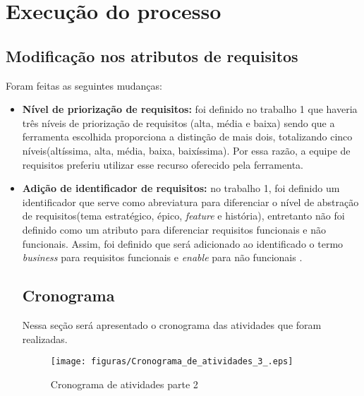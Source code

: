 \chapter[Execução do processo]{Execução do processo}

\section{Modificação nos atributos de requisitos}
Foram feitas as seguintes mudanças:
\begin{itemize}
\item \textbf{Nível de priorização de requisitos:}
foi definido no trabalho 1 que haveria três níveis de priorização de requisitos (alta, média e baixa) sendo que a ferramenta escolhida proporciona a distinção de mais dois, totalizando cinco níveis(altíssima, alta, média, baixa, baixíssima). Por essa razão, a equipe de requisitos preferiu utilizar esse recurso oferecido pela ferramenta.
\item \textbf{Adição de identificador de requisitos:}
no trabalho 1, foi definido um identificador que serve como abreviatura para diferenciar o nível de abstração de requisitos(tema estratégico, épico, \textit{feature} e história), entretanto não foi definido como um atributo para diferenciar requisitos funcionais e não funcionais. Assim, foi definido que será adicionado ao identificado o termo \textit{business} para requisitos funcionais e \textit{enable} para não funcionais \cite{safe}.
\section{Cronograma}
Nessa seção será apresentado o cronograma das atividades que foram realizadas. 
\begin{figure}[H]
    \centering
    \label{cronogramaSegundaParte}
    \texttt{[image: figuras/Cronograma\_de\_atividades\_3\_.eps]}
    \caption[Cronograma 2]{Cronograma de atividades parte 2}
\end{figure}
\end{itemize}

